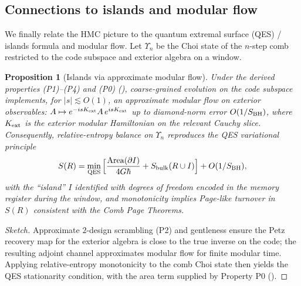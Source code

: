 \documentclass[a4paper,11pt]{article}
\newcommand{\HMC}{\textup{\textsc{HMC}}\xspace}
\theoremstyle{plain}
\newtheorem{proposition}{Proposition}
\theoremstyle{definition}
\theoremstyle{remark}
\begin{document}
\subsection{Connections to islands and modular flow}
\label{sec:islands-modular}
We finally relate the \HMC{} picture to the quantum extremal surface (QES) / islands formula and modular flow.
Let $\Upsilon_{n}$ be the Choi state of the $n$-step comb restricted to the code subspace and exterior algebra on a window.
\begin{proposition}[Islands via approximate modular flow]\label{prop:islands-modular}
Under the derived properties (P1)--(P4) and (P0) (), coarse-grained evolution on the code subspace implements, for $|s|\lesssim O(1)$,
an \emph{approximate modular flow} on exterior observables: $A\mapsto e^{-isK_{\rm ext}}A\,e^{isK_{\rm ext}}$ up to
diamond-norm error $O(1/S_{\rm BH})$, where $K_{\rm ext}$ is the exterior modular Hamiltonian on the relevant Cauchy slice.
Consequently, relative-entropy balance on $\Upsilon_{n}$ reproduces the QES variational principle
\begin{equation}
S(R)=\min_{\rm QES}\Big[\frac{{\rm Area}(\partial I)}{4G\hbar}+S_{\rm bulk}(R\cup I)\Big] + O(1/S_{\rm BH}),
\end{equation}
with the ``island'' $I$ identified with degrees of freedom encoded in the memory register during the window, and
monotonicity implies Page-like turnover in $S(R)$ consistent with the Comb Page Theorems.
\end{proposition}
\begin{proof}[Sketch]
Approximate $2$-design scrambling (P2) and gentleness ensure the Petz recovery map for the exterior algebra is close to the true
inverse on the code; the resulting adjoint channel approximates modular flow for finite modular time. Applying relative-entropy
monotonicity to the comb Choi state then yields the QES stationarity condition, with the area term supplied by Property P0 ().
\end{proof}
\end{document}
